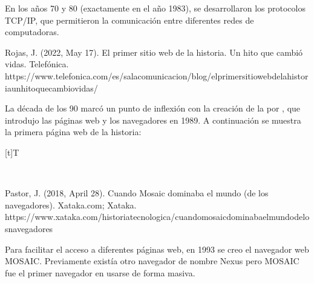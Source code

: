 \documentclass[letterpaper,10pt,spanish]{sphinxmanual}
\let\sphinxpxdimen\pdfpxdimen\else\newdimen\sphinxpxdimen
\begin{document}
\sphinxAtStartPar
En los años 70 y 80 (exactamente en el año 1983), se desarrollaron los protocolos TCP/IP, que permitieron la comunicación entre diferentes redes de computadoras.

\sphinxAtStartPar
%
\begin{footnote}[2]\sphinxAtStartFootnote
Rojas, J. (2022, May 17). El primer sitio web de la historia. Un hito que cambió vidas. Telefónica. https://www.telefonica.com/es/sala\sphinxhyphen{}comunicacion/blog/el\sphinxhyphen{}primer\sphinxhyphen{}sitio\sphinxhyphen{}web\sphinxhyphen{}de\sphinxhyphen{}la\sphinxhyphen{}historia\sphinxhyphen{}un\sphinxhyphen{}hito\sphinxhyphen{}que\sphinxhyphen{}cambio\sphinxhyphen{}vidas/
%
\end{footnote} La década de los 90 marcó un punto de inflexión con la creación de la  por , que introdujo las páginas web y los navegadores en 1989. A continuación se muestra la primera página web de la historia:


\begin{savenotes}\sphinxattablestart
\sphinxthistablewithglobalstyle
\centering
\begin{tabulary}{\linewidth}[t]{T}
\sphinxtoprule
\sphinxtableatstartofbodyhook

\begin{sphinxfigure-in-table}
\centering
\capstart
\noindent\sphinxincludegraphics[width=700\sphinxpxdimen]{{image02}.png}
\label{\detokenize{cursos/informatica10/recursos/T01:id27}}\end{sphinxfigure-in-table}\relax
\\
\sphinxbottomrule
\end{tabulary}
\sphinxtableafterendhook\par
\sphinxattableend\end{savenotes}

\sphinxAtStartPar
%
\begin{footnote}[3]\sphinxAtStartFootnote
Pastor, J. (2018, April 28). Cuando Mosaic dominaba el mundo (de los navegadores). Xataka.com; Xataka. https://www.xataka.com/historia\sphinxhyphen{}tecnologica/cuando\sphinxhyphen{}mosaic\sphinxhyphen{}dominaba\sphinxhyphen{}el\sphinxhyphen{}mundo\sphinxhyphen{}de\sphinxhyphen{}los\sphinxhyphen{}navegadores
%
\end{footnote} Para facilitar el acceso a diferentes páginas web, en 1993 se creo el navegador web MOSAIC. Previamente existía otro navegador de nombre Nexus pero MOSAIC fue el primer navegador en usarse de forma masiva.
\end{document}
